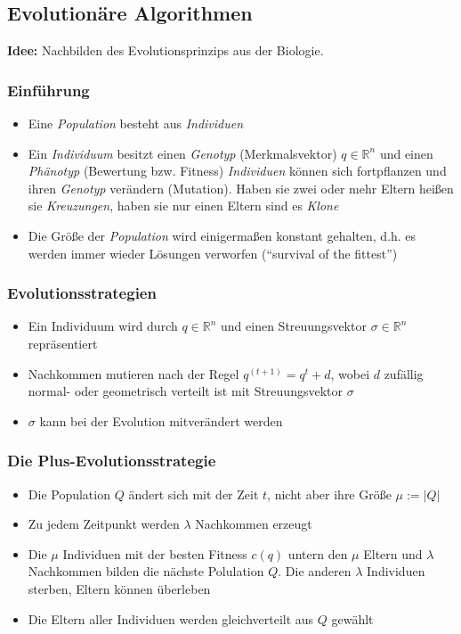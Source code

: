 \subsection{Evolutionäre Algorithmen}
\textbf{Idee:} Nachbilden des Evolutionsprinzips aus der Biologie.

\subsubsection{Einführung}
\begin{itemize}
	\item Eine \textit{Population} besteht aus \textit{Individuen}
	\item Ein \textit{Individuum} besitzt einen \textit{Genotyp} (Merkmalsvektor) \(q \in \mathbb{R}^n\) und einen \textit{Phänotyp} (Bewertung bzw. Fitness)
	\textit{Individuen} können sich fortpflanzen und ihren \textit{Genotyp} verändern (Mutation). Haben sie zwei oder mehr Eltern heißen sie \textit{Kreuzungen}, haben sie nur einen Eltern sind es \textit{Klone}
	\item Die Größe der \textit{Population} wird einigermaßen konstant gehalten, d.h. es werden immer wieder Lösungen verworfen ("`survival of the fittest"')
\end{itemize}

\subsubsection{Evolutionsstrategien}
\begin{itemize}
	\item Ein Individuum wird durch \(q \in \mathbb{R}^n\) und einen Streuungsvektor \(\sigma \in \mathbb{R}^n\) repräsentiert
	\item Nachkommen mutieren nach der Regel \(q^{(t+1)} = q^t+d\), wobei \(d\) zufällig normal- oder geometrisch verteilt ist mit Streuungsvektor \(\sigma\)
	\item \(\sigma\) kann bei der Evolution mitverändert werden
\end{itemize}

\subsubsection{Die Plus-Evolutionsstrategie}
\begin{itemize}
	\item Die Population \(Q\) ändert sich mit der Zeit \(t\), nicht aber ihre Größe \(\mu := |Q|\)
	\item Zu jedem Zeitpunkt werden \(\lambda\) Nachkommen erzeugt
	\item Die \(\mu\) Individuen mit der besten Fitness \(c(q)\) untern den \(\mu\) Eltern und \(\lambda\) Nachkommen bilden die nächste Polulation \(Q\). Die anderen \(\lambda\) Individuen sterben, Eltern können überleben
	\item Die Eltern aller Individuen werden gleichverteilt aus \(Q\) gewählt 
\end{itemize}

